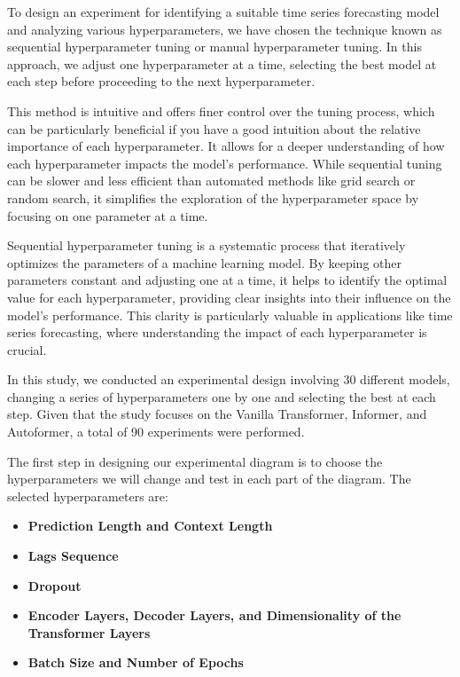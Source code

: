 To design an experiment for identifying a suitable time series forecasting model and analyzing various hyperparameters, we have chosen the technique known as sequential hyperparameter tuning or manual hyperparameter tuning. In this approach, we adjust one hyperparameter at a time, selecting the best model at each step before proceeding to the next hyperparameter.

This method is intuitive and offers finer control over the tuning process, which can be particularly beneficial if you have a good intuition about the relative importance of each hyperparameter. It allows for a deeper understanding of how each hyperparameter impacts the model's performance. While sequential tuning can be slower and less efficient than automated methods like grid search or random search, it simplifies the exploration of the hyperparameter space by focusing on one parameter at a time.

Sequential hyperparameter tuning is a systematic process that iteratively optimizes the parameters of a machine learning model. By keeping other parameters constant and adjusting one at a time, it helps to identify the optimal value for each hyperparameter, providing clear insights into their influence on the model's performance. This clarity is particularly valuable in applications like time series forecasting, where understanding the impact of each hyperparameter is crucial.

In this study, we conducted an experimental design involving 30 different models, changing a series of hyperparameters one by one and selecting the best at each step. Given that the study focuses on the Vanilla Transformer, Informer, and Autoformer, a total of 90 experiments were performed.

The first step in designing our experimental diagram is to choose the hyperparameters we will change and test in each part of the diagram. The selected hyperparameters are:

\begin{itemize}
    \item \textbf{Prediction Length and Context Length}
    \item \textbf{Lags Sequence}
    \item \textbf{Dropout}
    \item \textbf{Encoder Layers, Decoder Layers, and Dimensionality of the Transformer Layers}
    \item \textbf{Batch Size and Number of Epochs}
\end{itemize}

